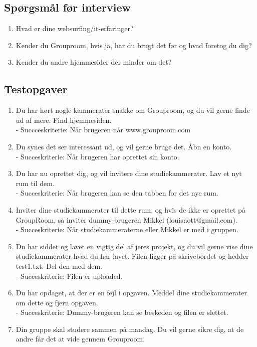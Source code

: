 \documentclass[12pt]{article}
\begin{document}
\subsection{Spørgsmål før interview}
\begin{enumerate}
  \item Hvad er dine websurfing/it-erfaringer?
  \item Kender du Grouproom, hvis ja, har du brugt det før og hvad foretog du dig?
  \item Kender du andre hjemmesider der minder om det?
\end{enumerate}
\subsection{Testopgaver}
\begin{enumerate}
\item Du har hørt nogle kammerater snakke om Grouproom, og du vil gerne finde ud af mere. Find hjemmesiden.\\
- Succceskriterie: Når brugeren når www.grouproom.com
\item Du synes det ser interessant ud, og vil gerne bruge det. Åbn en konto.\\
- Succeskriterie: Når brugeren har oprettet sin konto.
\item Du har nu oprettet dig, og vil invitere dine studiekammerater. Lav et nyt rum til dem.\\
- Succeskriterie: Når brugeren kan se den tabben for det nye rum.
\item Inviter dine studiekammerater til dette rum, og hvis de ikke er oprettet på GroupRoom, så inviter dummy-brugeren Mikkel (louisnott@gmail.com).\\
- Succeskriterie: Når studiekammeraterne eller Mikkel er med i gruppen.
\item Du har siddet og lavet en vigtig del af jeres projekt, og du vil gerne vise dine studiekammerater hvad du har lavet. Filen ligger på skrivebordet og hedder test1.txt. Del den med dem.\\
- Succeskriterie: Filen er uploaded.
\item Du har opdaget, at der er en fejl i opgaven. Meddel dine studiekammerater om dette og fjern opgaven.\\
- Succeskriterie: Dummy-brugeren kan se beskeden og filen er slettet.
\item Din gruppe skal studere sammen på mandag. Du vil gerne sikre dig, at de andre får det at vide gennem Grouproom.\\

\end{enumerate}
\end{document}

